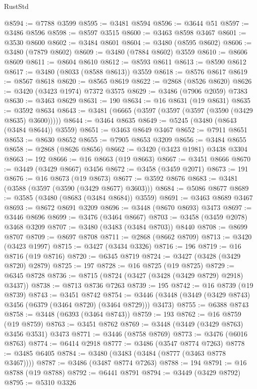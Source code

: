\begin{lexlean}{RustStd}
\begin{coremodule}
{\begin{coremodule}
{{{{{{{{{{{{{{{{{{{{{{{{{{{{{{{{{{{{{{{{{{{{{{{{{{{{{{{{{{{{{{{{{{{{{{{{{{{{{{{{{{{{{@8594 := @7788 @3599
@8595 := @3481 @8594
@8596 := @3644 @51
@8597 := @3486 @8596
@8598 := @8597 @3515
@8600 := @3463 @8598 @3467
@8601 := @3530 @8600
@8602 := @3484 @8601
@8604 := @3480 (@8595 @8602)
@8606 := @3480 (@7879 @8602)
@8609 := @3480 (@7884 @8602) @3559
@8610 := @8606 @8609
@8611 := @8604 @8610
@8612 := @8593 @8611
@8613 := @8590 @8612
@8617 := @3480 (@8033 (@8588 @8613)) @3559
@8618 := @8576 @8617
@8619 := @8567 @8618
@8620 := @8565 @8619
@8622 := @2868 (@8526 @8620)
@8626 := @3420 (@3423 @1974) @7372 @3575
@8629 := @3486 (@7906 @2059) @7383
@8630 := @3463 @8629
@8631 := 190
@8634 := @16 @8631 (@19 @8631)
@8635 := @3592 @8634
@8643 := @3481 (@6665 (@3597 (@3597 (@3597 (@3590 (@3429 @8635) @3600)))))
@8644 := @3464 @8635
@8649 := @5245 (@3480 (@8643 (@3484 @8644)) @3559)
@8651 := @3463 @8649 @3467
@8652 := @7911 @8651
@8653 := @8630 @8652
@8655 := @7905 @8653 @3209
@8656 := @3484 @8655
@8658 := @2868 (@8626 @8656)
@8662 := @3420 (@3423 @1981) @3438 @3304
@8663 := 192
@8666 := @16 @8663 (@19 @8663)
@8667 := @3451 @8666
@8670 := @3449 (@3429 @8667) @3456
@8672 := @3458 (@3459 @2071)
@8673 := 191
@8676 := @16 @8673 (@19 @8673)
@8677 := @3592 @8676
@8683 := @3481 (@3588 (@3597 (@3590 (@3429 @8677) @3603)))
@8684 := @5086 @8677
@8689 := @3585 (@3480 (@8683 (@3484 @8684)) @3559)
@8691 := @3463 @8689 @3467
@8693 := @8672 @8691 @3209
@8696 := @3448 (@8670 @8693) @3473
@8697 := @3446 @8696
@8699 := @3476 (@3464 @8667)
@8703 := @3458 (@3459 @2078) @3468 @3209
@8707 := @3480 (@3483 (@3484 @8703)) @8440
@8708 := @8699 @8707
@8709 := @8697 @8708
@8711 := @2868 (@8662 @8709)
@8713 := @3420 (@3423 @1997)
@8715 := @3427 (@3434 @3326)
@8716 := 196
@8719 := @16 @8716 (@19 @8716)
@8720 := @6345 @8719
@8724 := @3427 (@3428 (@3429 @8720) @2879)
@8725 := 197
@8728 := @16 @8725 (@19 @8725)
@8729 := @6345 @8728
@8736 := @8715 (@8724 (@3427 (@3428 (@3429 @8729) @2918) @3437))
@8738 := @8713 @8736 @7263
@8739 := 195
@8742 := @16 @8739 (@19 @8739)
@8743 := @3451 @8742
@8754 := @3446 (@3448 (@3449 (@3429 @8743) @3456 (@6379 (@3464 @8720) (@3464 @8729))) @3473)
@8755 := @6388 @8743
@8758 := @3448 (@6393 (@3464 @8743))
@8759 := 193
@8762 := @16 @8759 (@19 @8759)
@8763 := @3451 @8762
@8769 := @3448 (@3449 (@3429 @8763) @3456 @3531) @3473
@8771 := @3446 (@8758 @8769)
@8773 := @3476 (@6016 @8763)
@8774 := @6414 @2918
@8777 := @3486 (@3547 @8774 @7263)
@8778 := @3485 @6405
@8784 := @3480 (@3483 (@3484 (@8777 (@3463 @8778 @3467))))
@8787 := @3486 (@3487 @8774 @7263)
@8788 := 194
@8791 := @16 @8788 (@19 @8788)
@8792 := @6441 @8791
@8794 := @3449 (@3429 @8792)
@8795 := @5310 @3326
}}}}}}}}}}}}}}}}}}}}}}}}}}}}}}}}}}}}}}}}}}}}}}}}}}}}}}}}}}}}}}}}}}}}}}}}}}}}}}}}}}}}}
\end{coremodule}}
\end{coremodule}
\end{lexlean}
